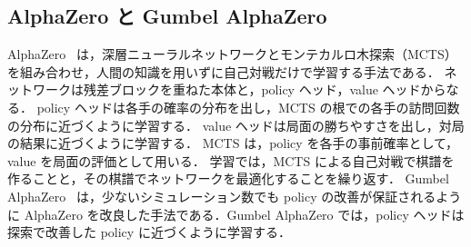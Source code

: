 \documentclass[submit]{ipsj}
\begin{document}
\subsection{AlphaZero と Gumbel AlphaZero}
AlphaZero~\cite{alphazero} は，深層ニューラルネットワークとモンテカルロ木探索（MCTS）を組み合わせ，人間の知識を用いずに自己対戦だけで学習する手法である．
ネットワークは残差ブロックを重ねた本体と，policy ヘッド，value ヘッドからなる．
policy ヘッドは各手の確率の分布を出し，MCTS の根での各手の訪問回数の分布に近づくように学習する．
value ヘッドは局面の勝ちやすさを出し，対局の結果に近づくように学習する．
MCTS は，policy を各手の事前確率として，value を局面の評価として用いる．
学習では，MCTS による自己対戦で棋譜を作ることと，その棋譜でネットワークを最適化することを繰り返す．
Gumbel AlphaZero~\cite{gumbel} は，少ないシミュレーション数でも policy の改善が保証されるように AlphaZero を改良した手法である．Gumbel AlphaZero では，policy ヘッドは探索で改善した policy に近づくように学習する．
\end{document}
